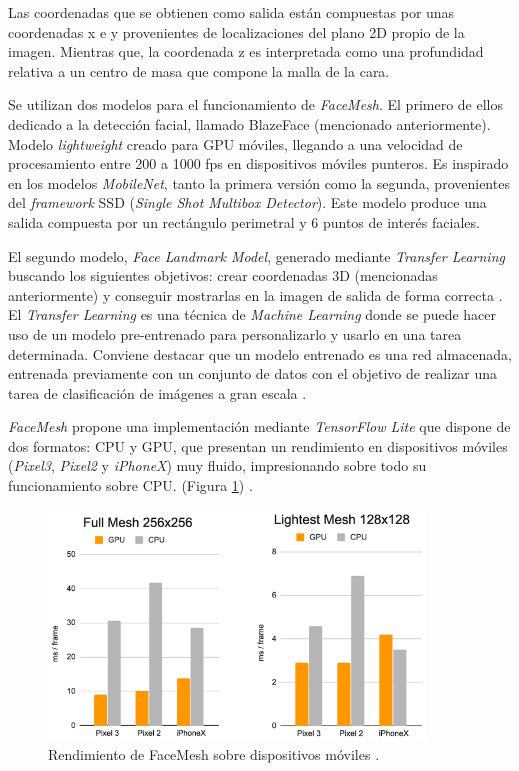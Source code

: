 Las coordenadas que se obtienen como salida están compuestas por unas coordenadas x e y provenientes de localizaciones del plano 2D propio de la imagen. Mientras que, la coordenada z es interpretada como una profundidad relativa a un centro de masa que compone la malla de la cara.

Se utilizan dos modelos para el funcionamiento de \textit{FaceMesh}. El primero de ellos dedicado a la detección facial, llamado BlazeFace (mencionado anteriormente). Modelo \textit{lightweight} creado para GPU móviles, llegando a una velocidad de procesamiento entre 200 a 1000 fps en dispositivos móviles punteros. Es inspirado en los modelos \textit{MobileNet}, tanto la primera versión como la segunda, provenientes del \textit{framework} SSD (\textit{Single Shot Multibox Detector}). Este modelo produce una salida compuesta por un rectángulo perimetral y 6 puntos de interés faciales. \cite{blazeface}

El segundo modelo, \textit{Face Landmark Model}, generado mediante \textit{Transfer Learning} buscando los siguientes objetivos: crear coordenadas 3D (mencionadas anteriormente) y conseguir mostrarlas en la imagen de salida de forma correcta \cite{faceMesh}. El \textit{Transfer Learning} es una técnica de \textit{Machine Learning} donde se puede hacer uso de un modelo pre-entrenado para personalizarlo y usarlo en una tarea determinada. Conviene destacar que un modelo entrenado es una red almacenada, entrenada previamente con un conjunto de datos con el objetivo de realizar una tarea de clasificación de imágenes a gran escala \cite{transferLearning}.

\textit{FaceMesh} propone una implementación mediante \textit{TensorFlow Lite} que dispone de dos formatos: CPU y GPU, que presentan un rendimiento en dispositivos móviles (\textit{Pixel3}, \textit{Pixel2} y \textit{iPhoneX}) muy fluido, impresionando sobre todo su funcionamiento sobre CPU. (Figura \ref{fig:faceMeshRen}) \cite{faceMesh3}.

\begin{figure}[htp]
	\centering
	\includegraphics[width=10cm]{imagenes/rendFaceMesh.png}
	\caption[Rendimiento de FaceMesh sobre dispositivos móviles.]{Rendimiento de FaceMesh sobre dispositivos móviles \cite{faceMesh3}.}
	\label{fig:faceMeshRen}
\end{figure}

